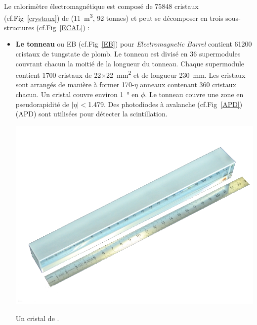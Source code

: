 Le calorimètre électromagnétique est composé de \num{75848} cristaux (cf.Fig~\ref{crystaux}) de  (\SI{11}{\cubic\meter}, \num{92} tonnes) et peut se décomposer en trois sous-structures (cf.Fig~\ref{ECAL}) :
\begin{itemize}[label=$\bullet$]
	\item \textbf{Le tonneau} ou EB (cf.Fig~\ref{EB}) pour \textit{Electromagnetic Barrel} contient \num{61200} cristaux de tungstate de plomb. Le tonneau est divisé en \num{36} supermodules couvrant chacun la moitié de la longueur du tonneau. Chaque supermodule contient \num{1700} cristaux de \num{22}$\times$\SI{22}{\square\milli\meter} et de longueur \SI{230}{\milli\meter}. Les cristaux sont arrangés de manière à former \num{170}-$\eta$ anneaux contenant \num{360} cristaux chacun. Un cristal couvre environ \SI{1}{\degree} en $\phi$. Le tonneau couvre une zone en pseudorapidité de $|\eta|<$\num{1.479}. Des photodiodes à avalanche (cf.Fig~\ref{APD}) (APD) sont utilisées pour détecter la scintillation.
	\marginpar
	{
		\centering
		\includegraphics[width=\marginparwidth]{CMS/Crystaux.png}
		\captionsetup{type=figure}\caption{Un cristal de .}
		\label{crystaux}
	}
	

\end{itemize}
